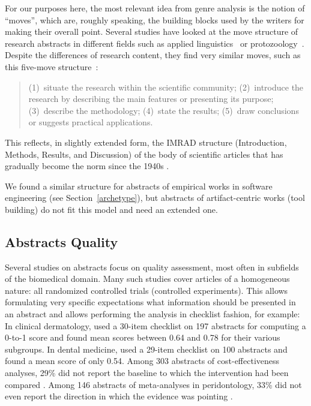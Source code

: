 \documentclass[10pt,journal,compsoc]{IEEEtran}
\begin{document}
For our purposes here, the most relevant idea from genre analysis is the notion
of ``moves'', which are, roughly speaking, the building blocks used by the writers
for making their overall point.
Several studies have looked at the move structure of research abstracts
in different fields such as
applied linguistics~\cite{DosSantos96} or
protozoology~\cite{CroOpp06}.
Despite the differences of research content, they find very similar moves,
such as this five-move structure~\cite{CroOpp06}:
\begin{quote}
	(1)~situate the research within the scientific community;
	(2)~introduce the research by describing the main features or presenting its purpose;
	(3)~describe the methodology;
	(4)~state the results;
	(5)~draw conclusions or suggests practical applications.
\end{quote}
This reflects, in slightly extended form, the IMRAD structure 
(Introduction, Methods, Results, and Discussion) of the body of scientific articles
that has gradually become the norm since the 1940s \cite{SolPer04}.

We found a similar structure for abstracts of 
empirical works in software engineering (see Section~\ref{archetype}),
but abstracts of artifact-centric works (tool building) do not fit this model and need
an extended one.


\subsection{Abstracts Quality}\label{relatedworkquality}

Several studies on abstracts focus on quality assessment,
most often in subfields of the biomedical domain.
Many such studies cover articles of a homogeneous nature:
all randomized controlled trials (controlled experiments).
This allows formulating very specific expectations what information should be
presented in an abstract and allows performing the analysis in checklist fashion,
for example:
In clinical dermatology, \cite{DupKhoLeb03} used a 30-item checklist on 197 abstracts
  for computing a 0-to-1 score and found mean scores between 0.64 and 0.78 for their various subgroups.
In dental medicine, \cite{ShaHar06} used a 29-item checklist on 100 abstracts
  and found a mean score of only 0.54.
Among 303 abstracts of cost-effectiveness analyses,
  29\% did not report the baseline to which the intervention
  had been compared \cite{RosGreSto05}.
Among 146 abstracts of meta-analyses in peridontology, 
  33\% did not even report the direction in which  
  the evidence was pointing \cite{FagLiuHud14}.
  
\end{document}
